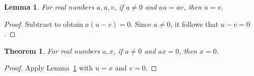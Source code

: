 \documentclass{article}
\newtheorem{theorem}{Theorem}
\newtheorem{lemma}{Lemma}
\begin{document}
\begin{lemma}\label{lem:scope-cancel}
For real numbers $a,u,v$, if $a\ne 0$ and $au=av$, then $u=v$.
\end{lemma}
\begin{proof}
Subtract to obtain $a(u-v)=0$. Since $a\ne 0$, it follows that $u-v=0$.
\end{proof}

\begin{theorem}\label{thm:scope-clean-dependency}
For real numbers $a,x$, if $a\ne 0$ and $ax=0$, then $x=0$.
\end{theorem}
\begin{proof}
Apply Lemma~\ref{lem:scope-cancel} with $u=x$ and $v=0$.
\end{proof}
\end{document}
